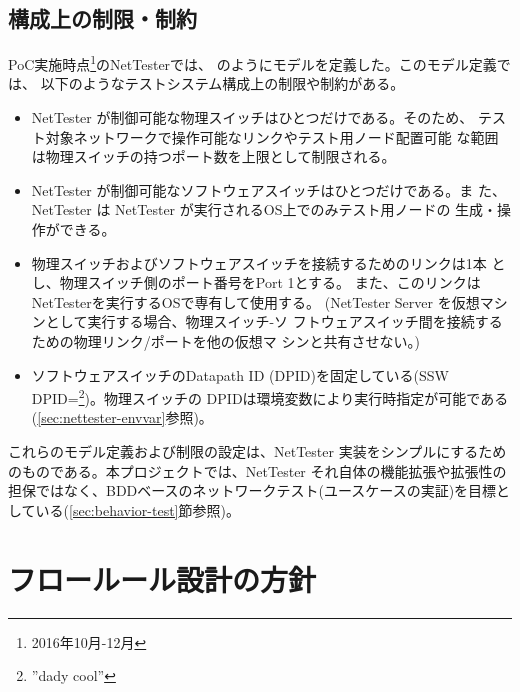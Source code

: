   \subsection{構成上の制限・制約}
  \label{sec:nettester-model-restriction}

PoC実施時点\footnote{2016年10月-12月}のNetTesterでは、
のようにモデルを定義した。このモデル定義では、
以下のようなテストシステム構成上の制限や制約がある。
\begin{itemize}
 \item NetTester が制御可能な物理スイッチはひとつだけである。そのため、
       テスト対象ネットワークで操作可能なリンクやテスト用ノード配置可能
       な範囲は物理スイッチの持つポート数を上限として制限される。
 \item NetTester が制御可能なソフトウェアスイッチはひとつだけである。ま
       た、NetTester は NetTester が実行されるOS上でのみテスト用ノードの
       生成・操作ができる。
 \item 物理スイッチおよびソフトウェアスイッチを接続するためのリンクは1本
       とし、物理スイッチ側のポート番号をPort 1とする。
       また、このリンクはNetTesterを実行するOSで専有して使用する。
       (NetTester Server を仮想マシンとして実行する場合、物理スイッチ-ソ
       フトウェアスイッチ間を接続するための物理リンク/ポートを他の仮想マ
       シンと共有させない。)
 \item ソフトウェアスイッチのDatapath ID (DPID)を固定している(SSW
       DPID=\footnote{''dady cool''})。物理スイッチの
       DPIDは環境変数により実行時指定が可能である
       (\ref{sec:nettester-envvar}参照)。
\end{itemize}
これらのモデル定義および制限の設定は、NetTester 実装をシンプルにするため
のものである。本プロジェクトでは、NetTester それ自体の機能拡張や拡張性の
担保ではなく、BDDベースのネットワークテスト(ユースケースの実証)を目標と
している(\ref{sec:behavior-test}節参照)。

 \section{フロールール設計の方針}
 \label{sec:flow-design-policy}

